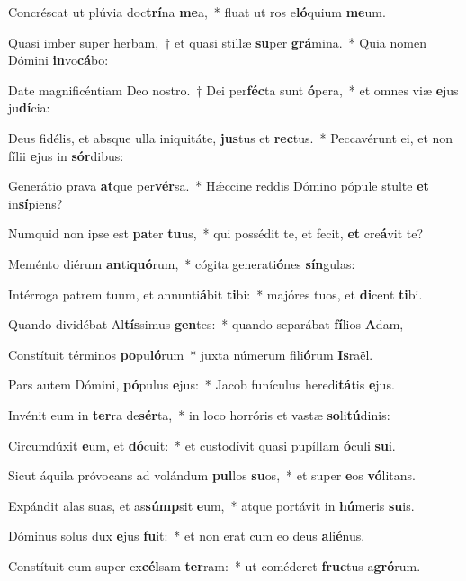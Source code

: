 \item Concréscat ut plúvia doc\textbf{trí}na \textbf{me}a,~* fluat ut ros e\textbf{ló}quium \textbf{me}um.
\item Quasi imber super herbam,~† et quasi stillæ \textbf{su}per \textbf{grá}mina.~* Quia nomen Dómini \textbf{in}vo\textbf{cá}bo:
\item Date magnificéntiam Deo nostro.~† Dei per\textbf{féc}ta sunt \textbf{ó}pera,~* et omnes viæ \textbf{e}jus ju\textbf{dí}cia:
\item Deus fidélis, et absque ulla iniquitáte, \textbf{jus}tus et \textbf{rec}tus.~* Peccavérunt ei, et non fílii \textbf{e}jus in \textbf{sór}dibus:
\item Generátio prava \textbf{at}que per\textbf{vér}sa.~* Hǽccine reddis Dómino pópule stulte \textbf{et} in\textbf{sí}piens?
\item Numquid non ipse est \textbf{pa}ter \textbf{tu}us,~* qui possédit te, et fecit, \textbf{et} cre\textbf{á}vit te?
\item Meménto diérum \textbf{an}ti\textbf{quó}rum,~* cógita generati\textbf{ó}nes \textbf{sín}gulas:
\item Intérroga patrem tuum, et annunti\textbf{á}bit \textbf{ti}bi:~* majóres tuos, et \textbf{di}cent \textbf{ti}bi.
\item Quando dividébat Al\textbf{tís}simus \textbf{gen}tes:~* quando separábat \textbf{fí}lios \textbf{A}dam,
\item Constítuit términos \textbf{po}pu\textbf{ló}rum~* juxta númerum fili\textbf{ó}rum \textbf{Is}raël.
\item Pars autem Dómini, \textbf{pó}pulus \textbf{e}jus:~* Jacob funículus heredi\textbf{tá}tis \textbf{e}jus.
\item Invénit eum in \textbf{ter}ra de\textbf{sér}ta,~* in loco horróris et vastæ \textbf{so}li\textbf{tú}dinis:
\item Circumdúxit \textbf{e}um, et \textbf{dó}cuit:~* et custodívit quasi pupíllam \textbf{ó}culi \textbf{su}i.
\item Sicut áquila próvocans ad volándum \textbf{pul}los \textbf{su}os,~* et super \textbf{e}os \textbf{vó}litans.
\item Expándit alas suas, et as\textbf{súmp}sit \textbf{e}um,~* atque portávit in \textbf{hú}meris \textbf{su}is.
\item Dóminus solus dux \textbf{e}jus \textbf{fu}it:~* et non erat cum eo deus \textbf{a}li\textbf{é}nus.
\item Constítuit eum super ex\textbf{cél}sam \textbf{ter}ram:~* ut coméderet \textbf{fruc}tus a\textbf{gró}rum.

